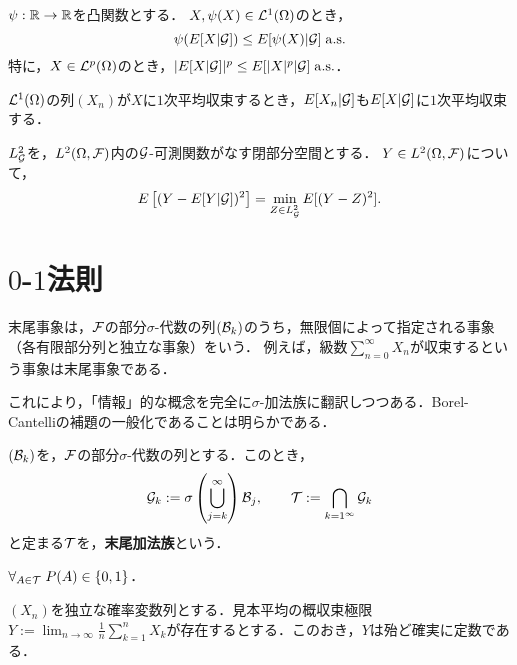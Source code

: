 \documentclass[uplatex,dvipdfmx]{jsreport}
\begin{document}
\begin{proposition}
    $\psi:\mathbb{R}\to\mathbb{R}$を凸関数とする．
    $X,\psi(X)\in\mathcal{L}^1(\Omega)$のとき，
    \[\psi(E[X|\mathcal{G}])\le E[\psi(X)|\mathcal{G}]\;\mathrm{a.s.}\]
    特に，$X\in\mathcal{L}^p(\Omega)$のとき，$\lvert E[X|\mathcal{G}]\rvert^p\le E[\lvert X\rvert^p|\mathcal{G}]\;\mathrm{a.s.}$．
\end{proposition}

\begin{proposition}
    $\mathcal{L}^1(\Omega)$の列$(X_n)$が$X$に$1$次平均収束するとき，$E[X_n|\mathcal{G}]$も$E[X|\mathcal{G}]$に$1$次平均収束する．
\end{proposition}

\begin{theorem}[直交射影としての条件付き期待値]
    $L_{\mathcal{G}}^2$を，$L^2(\Omega,\mathcal{F})$内の$\mathcal{G}$-可測関数がなす閉部分空間とする．
    $Y\in L^2(\Omega,\mathcal{F})$について，
    \[E\left[(Y-E[Y|\mathcal{G}])^2\right]=\min_{Z\in L^2_{\mathcal{G}}}E[(Y-Z)^2].\]
\end{theorem}

\section{$0$-$1$法則}

\begin{tcolorbox}[colframe=ForestGreen, colback=ForestGreen!10!white,breakable,colbacktitle=ForestGreen!40!white,coltitle=black,fonttitle=\bfseries\sffamily,
title=]
    末尾事象は，$\mathcal{F}$の部分$\sigma$-代数の列$(\mathcal{B}_k)$のうち，無限個によって指定される事象（各有限部分列と独立な事象）をいう．
    例えば，級数$\sum_{n=0}^\infty X_n$が収束するという事象は末尾事象である．

    これにより，「情報」的な概念を完全に$\sigma$-加法族に翻訳しつつある．Borel-Cantelliの補題の一般化であることは明らかである．
\end{tcolorbox}

\begin{definition}
    $(\mathcal{B}_k)$を，$\mathcal{F}$の部分$\sigma$-代数の列とする．このとき，
    \[\mathcal{G}_k:=\sigma\left(\bigcup_{j=k}^\infty\right)\mathcal{B}_j,\qquad\mathcal{T}:=\bigcap_{k=1^\infty}\mathcal{G}_k\]
    と定まる$\mathcal{T}$を，\textbf{末尾加法族}という．
\end{definition}

\begin{theorem}[Kolmogorov 0-1]
    $\forall_{A\in\mathcal{T}}\;P(A)\in\{0,1\}$．
\end{theorem}

\begin{corollary}
    $(X_n)$を独立な確率変数列とする．見本平均の概収束極限$Y:=\lim_{n\to\infty}\frac{1}{n}\sum_{k=1}^nX_k$が存在するとする．このおき，$Y$は殆ど確実に定数である．
\end{corollary}
\end{document}
